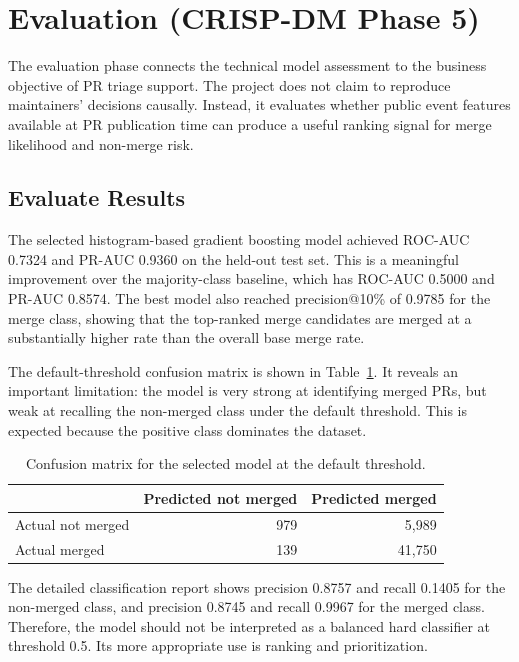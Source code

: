 \clearpage
\section{Evaluation (CRISP-DM Phase 5)}

The evaluation phase connects the technical model assessment to the business objective of PR triage support.
The project does not claim to reproduce maintainers' decisions causally. Instead, it evaluates whether public
event features available at PR publication time can produce a useful ranking signal for merge likelihood and
non-merge risk.

\subsection{Evaluate Results}

The selected histogram-based gradient boosting model achieved ROC-AUC 0.7324 and PR-AUC 0.9360 on the
held-out test set. This is a meaningful improvement over the majority-class baseline, which has ROC-AUC
0.5000 and PR-AUC 0.8574. The best model also reached precision@10\% of 0.9785 for the merge class, showing
that the top-ranked merge candidates are merged at a substantially higher rate than the overall base merge rate.

The default-threshold confusion matrix is shown in Table~\ref{tab:confusion_matrix}. It reveals an important
limitation: the model is very strong at identifying merged PRs, but weak at recalling the non-merged class
under the default threshold. This is expected because the positive class dominates the dataset.

\begin{table}[H]
    \centering
    \caption{Confusion matrix for the selected model at the default threshold.}
    \label{tab:confusion_matrix}
    \begin{tabular}{lrr}
        \toprule
        & Predicted not merged & Predicted merged \\
        \midrule
        Actual not merged & 979 & 5,989 \\
        Actual merged & 139 & 41,750 \\
        \bottomrule
    \end{tabular}
\end{table}

The detailed classification report shows precision 0.8757 and recall 0.1405 for the non-merged class, and
precision 0.8745 and recall 0.9967 for the merged class. Therefore, the model should not be interpreted as a
balanced hard classifier at threshold 0.5. Its more appropriate use is ranking and prioritization.

